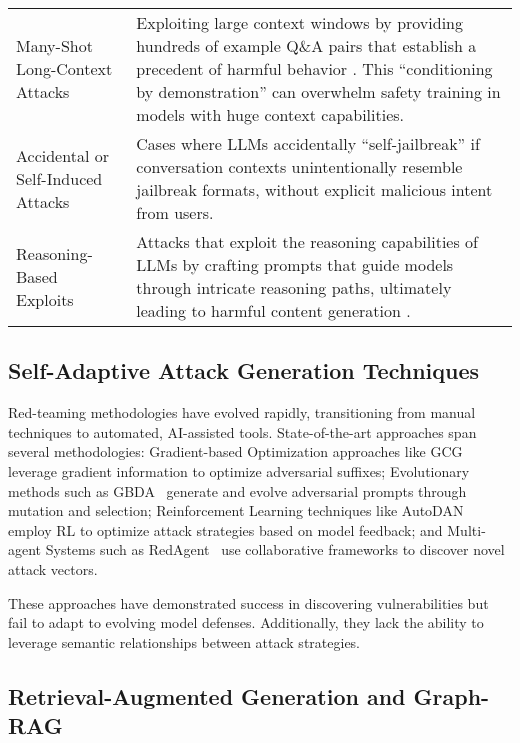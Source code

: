 \begin{longtable}{>{\raggedright\arraybackslash}p{}>{\raggedright\arraybackslash}p{}}
    Many-Shot Long-Context Attacks & Exploiting large context windows by providing hundreds of example Q\&A pairs that establish a precedent of harmful behavior \citep{Anthropic2024a, Anthropic2024b}. This ``conditioning by demonstration'' can overwhelm safety training in models with huge context capabilities. \\
    
    Accidental or Self-Induced Attacks & Cases where LLMs accidentally ``self-jailbreak'' if conversation contexts unintentionally resemble jailbreak formats, without explicit malicious intent from users. \\
    
    Reasoning-Based Exploits & Attacks that exploit the reasoning capabilities of LLMs by crafting prompts that guide models through intricate reasoning paths, ultimately leading to harmful content generation \citep{ReasoningJailbreak2024}. \\
    
    \end{longtable}

    
\subsection{Self-Adaptive Attack Generation Techniques}

Red-teaming methodologies have evolved rapidly, transitioning from manual techniques to automated, AI-assisted tools. State-of-the-art approaches span several methodologies: Gradient-based Optimization approaches like GCG~\cite{zou2023universal} leverage gradient information to optimize adversarial suffixes; Evolutionary methods such as GBDA~\cite{guo2021gradient} generate and evolve adversarial prompts through mutation and selection; Reinforcement Learning techniques like AutoDAN~\cite{liu2023autodan} employ RL to optimize attack strategies based on model feedback; and Multi-agent Systems such as RedAgent~\cite{xu2024redagent} use collaborative frameworks to discover novel attack vectors.

These approaches have demonstrated success in discovering vulnerabilities but fail to adapt to evolving model defenses. Additionally, they lack the ability to leverage semantic relationships between attack strategies.

\subsection{Retrieval-Augmented Generation and Graph-RAG}

